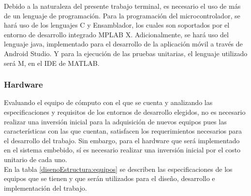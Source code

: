 Debido a la naturaleza del presente trabajo terminal, es necesario el uso de más de un lenguaje de programación. Para la programación del microcontrolador, se hará uso de los lenguajes C y Ensamblador, los cuales son soportados por el entorno de desarrollo integrado MPLAB X. Adicionalmente, se hará uso del lenguaje java, implementado para el desarrollo de la aplicación móvil a través de Android Studio. Y para la ejecución de las pruebas unitarias, el lenguaje utilizado será M, en el IDE de MATLAB.



\subsubsection{Hardware}
Evaluando el equipo de cómputo con el que se cuenta y analizando las especificaciones y requisitos de los entornos de desarrollo elegidos, no es necesario realizar una inversión inicial para la adquisición de nuevos equipos pues las características con las que cuentan, satisfacen los requerimientos necesarios para el desarrollo del trabajo. Sin embargo, para el hardware que será implementado en el sistema embebido, sí es necesario realizar una inversión inicial por el costo unitario de cada uno.\\

En la tabla \ref{disenoEstructura:equipos} se describen las especificaciones de los equipos que se tienen y que serán utilizados para el diseño, desarrollo e implementación del trabajo.


